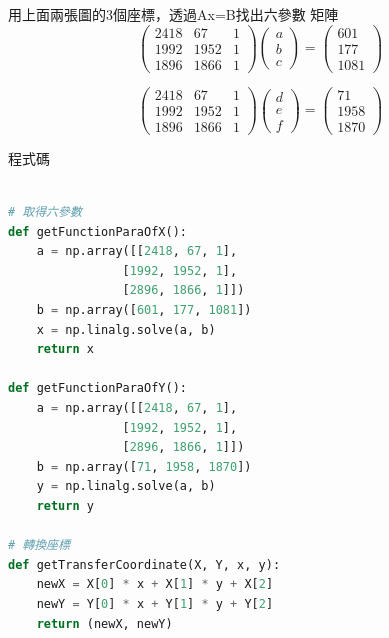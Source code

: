\documentclass[12pt,a4paper]{article}
\begin{document}
{
\fontsize{14pt}{10pt} %
\selectfont %
用上面兩張圖的3個座標，透過Ax=B找出六參數
\newline
\newline 矩陣
\[ %
\left(
\begin{array}{clr}
2418 & 67 & 1 \\ 1992 & 1952 & 1 \\ 1896 & 1866 & 1
\end{array}
\right)
\left(
\begin{array}{clr}
a \\ b \\ c
\end{array}
\right)
=
\left(
\begin{array}{clr}
601 \\ 177 \\ 1081
\end{array}
\right)
\] %

\[ %
\left(
\begin{array}{clr}
2418 & 67 & 1 \\ 1992 & 1952 & 1 \\ 1896 & 1866 & 1
\end{array}
\right)
\left(
\begin{array}{clr}
d \\ e \\ f
\end{array}
\right)
=
\left(
\begin{array}{clr}
71 \\ 1958 \\ 1870
\end{array}
\right)
\] %

程式碼
\begin{lstlisting}[language=Python]

# 取得六參數
def getFunctionParaOfX():
    a = np.array([[2418, 67, 1], 
    			[1992, 1952, 1], 
    			[2896, 1866, 1]])
    b = np.array([601, 177, 1081])
    x = np.linalg.solve(a, b)
    return x

def getFunctionParaOfY():
    a = np.array([[2418, 67, 1], 
    			[1992, 1952, 1], 
    			[2896, 1866, 1]])
    b = np.array([71, 1958, 1870])
    y = np.linalg.solve(a, b)
    return y
    
# 轉換座標
def getTransferCoordinate(X, Y, x, y):
    newX = X[0] * x + X[1] * y + X[2]
    newY = Y[0] * x + Y[1] * y + Y[2]
    return (newX, newY)
\end{lstlisting}
}
\end{document}
